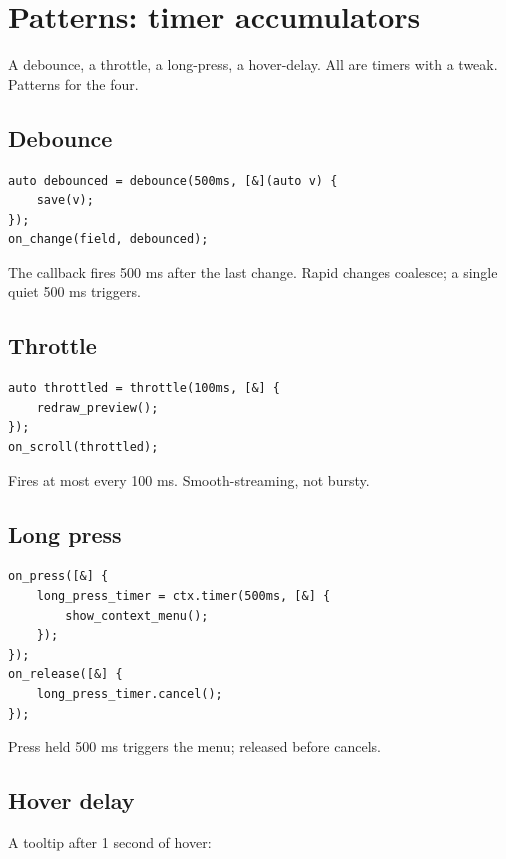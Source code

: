 \chapter{Patterns: timer accumulators}
\label{ch:timers}

\begin{aside}
A debounce, a throttle, a long-press, a hover-delay. All are
timers with a tweak. Patterns for the four.
\end{aside}

\section{Debounce}

\begin{lstlisting}
auto debounced = debounce(500ms, [&](auto v) {
    save(v);
});
on_change(field, debounced);
\end{lstlisting}

The callback fires 500 ms after the last change. Rapid
changes coalesce; a single quiet 500 ms triggers.

\section{Throttle}

\begin{lstlisting}
auto throttled = throttle(100ms, [&] {
    redraw_preview();
});
on_scroll(throttled);
\end{lstlisting}

Fires at most every 100 ms. Smooth-streaming, not bursty.

\section{Long press}

\begin{lstlisting}
on_press([&] {
    long_press_timer = ctx.timer(500ms, [&] {
        show_context_menu();
    });
});
on_release([&] {
    long_press_timer.cancel();
});
\end{lstlisting}

Press held 500 ms triggers the menu; released before
cancels.

\section{Hover delay}

A tooltip after 1 second of hover:

